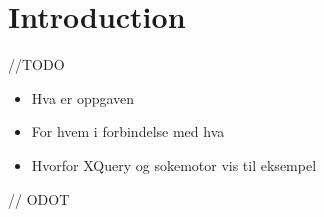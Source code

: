 \chapter{Introduction}
//TODO
\begin{itemize}
\item Hva er oppgaven
\item For hvem i forbindelse med hva
\item Hvorfor XQuery og sokemotor vis til eksempel
\end{itemize}


//  ODOT
